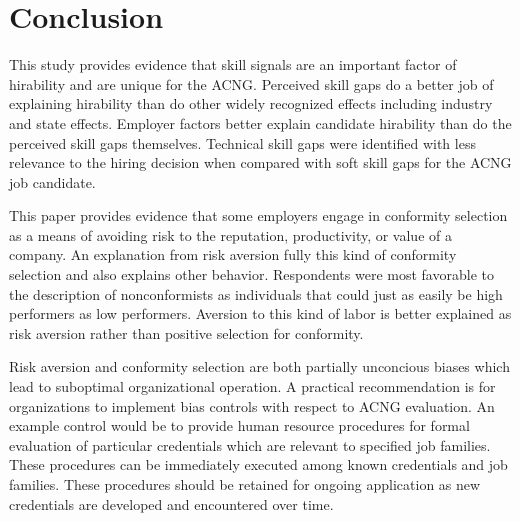 \documentclass[review]{elsarticle}
\begin{document}
\section{Conclusion}


This study provides evidence that skill signals are an important factor of hirability and are unique for the ACNG.
Perceived skill gaps do a better job of explaining hirability than do other widely recognized effects including industry and state effects.
Employer factors better explain candidate hirability than do the perceived skill gaps themselves.
Technical skill gaps were identified with less relevance to the hiring decision when compared with soft skill gaps for the ACNG job candidate.

This paper provides evidence that some employers engage in conformity selection as a means of avoiding risk to the reputation, productivity, or value of a company.
An explanation from risk aversion fully this kind of conformity selection and also explains other behavior.
Respondents were most favorable to the description of nonconformists as individuals that could just as easily be high performers as low performers.
Aversion to this kind of labor is better explained as risk aversion rather than positive selection for conformity.

Risk aversion and conformity selection are both partially unconcious biases which lead to suboptimal organizational operation.
A practical recommendation is for organizations to implement bias controls with respect to ACNG evaluation.
An example control would be to provide human resource procedures for formal evaluation of particular credentials which are relevant to specified job families.
These procedures can be immediately executed among known credentials and job families.
These procedures should be retained for ongoing application as new credentials are developed and encountered over time.
\end{document}
